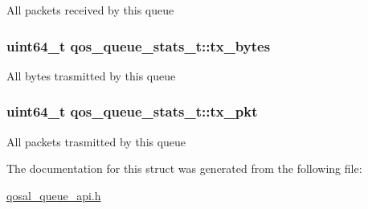 All packets received by this queue \hypertarget{structqos__queue__stats__t_a358b6a71b2faee13c4b52bfd86633aae}{
\subsubsection[{tx\-\_\-bytes}]{\setlength{\rightskip}{0pt plus 5cm}uint64\-\_\-t qos\-\_\-queue\-\_\-stats\-\_\-t\-::tx\-\_\-bytes}}\label{structqos__queue__stats__t_a358b6a71b2faee13c4b52bfd86633aae}
All bytes trasmitted by this queue \hypertarget{structqos__queue__stats__t_a121b80595d3faab041d2aebb2fbc1e72}{
\subsubsection[{tx\-\_\-pkt}]{\setlength{\rightskip}{0pt plus 5cm}uint64\-\_\-t qos\-\_\-queue\-\_\-stats\-\_\-t\-::tx\-\_\-pkt}}\label{structqos__queue__stats__t_a121b80595d3faab041d2aebb2fbc1e72}
All packets trasmitted by this queue 

The documentation for this struct was generated from the following file\-:\begin{DoxyCompactItemize}
\item 
\hyperlink{qosal__queue__api_8h}{qosal\-\_\-queue\-\_\-api.\-h}\end{DoxyCompactItemize}
